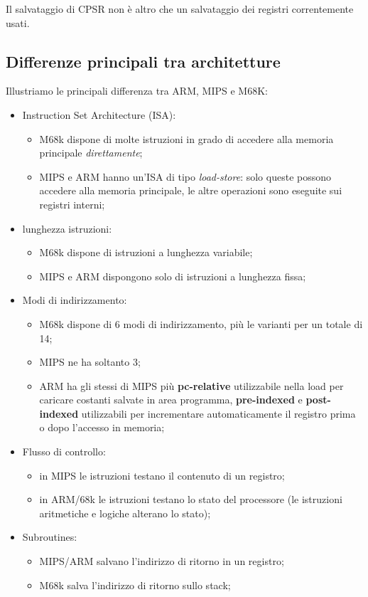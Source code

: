 Il salvataggio di CPSR non è altro che un salvataggio dei registri correntemente usati.

\subsection{Differenze principali tra architetture}
Illustriamo le principali differenza tra ARM, MIPS e M68K:

\begin{itemize}
    \item Instruction Set Architecture (ISA):
    \begin{itemize}
        \item M68k dispone di molte istruzioni in grado di accedere alla memoria principale \textit{direttamente};
        \item MIPS e ARM hanno un'ISA di tipo \textit{load-store}: solo queste possono accedere alla memoria principale, le altre operazioni sono eseguite sui registri interni;
    \end{itemize}
    \item lunghezza istruzioni:
    \begin{itemize}
        \item M68k dispone di istruzioni a lunghezza variabile;
        \item MIPS e ARM dispongono solo di istruzioni a lunghezza fissa;
    \end{itemize}
    \item Modi di indirizzamento:
    \begin{itemize}
        \item M68k dispone di 6 modi di indirizzamento, più le varianti per un totale di 14;
        \item MIPS ne ha soltanto 3;
        \item ARM ha gli stessi di MIPS più \textbf{pc-relative} utilizzabile nella load per caricare costanti salvate in area programma, \textbf{pre-indexed} e \textbf{post-indexed} utilizzabili per incrementare automaticamente il registro prima o dopo l'accesso in memoria;
    \end{itemize}
    \item Flusso di controllo:
    \begin{itemize}
        \item in MIPS le istruzioni testano il contenuto di un registro;
        \item in ARM/68k le istruzioni testano lo stato del processore (le istruzioni aritmetiche e logiche alterano lo stato);
    \end{itemize}
    \item Subroutines:
    \begin{itemize}
        \item MIPS/ARM salvano l'indirizzo di ritorno in un registro;
        \item M68k salva l'indirizzo di ritorno sullo stack; 
    \end{itemize}
\end{itemize}

